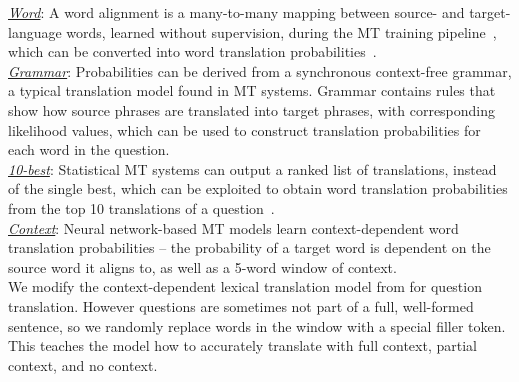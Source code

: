 \documentclass{sig-alternate-05-2015}
\begin{document}
\noindent \underline{\emph{Word}}: A word alignment is a many-to-many mapping between source- and target-language words,
learned without supervision, during the MT training pipeline~\cite{Och:2003a}, which 
can be converted into word translation probabilities~\cite{Darwish:2003aa}.\\
\underline{\emph{Grammar}}: Probabilities can be derived from a synchronous context-free grammar, a typical
translation model found in MT systems. Grammar contains rules that show how source phrases
are translated into target phrases, with corresponding likelihood values, which can be used to construct translation 
probabilities for each word in the question.\\
\underline{\emph{10-best}}: Statistical MT systems can output a ranked list of translations, instead of the single best, which 
can be exploited to obtain word translation probabilities from the top 10 translations of a question~\cite{Ture:2014aa}.\\
\underline{\emph{Context}}: Neural network-based MT models learn context-dependent word translation probabilities -- 
the probability of a target word is dependent on the source word it aligns to, as well as a 5-word window of context.\\
We modify the context-dependent lexical translation model from \cite{Devlin:2014} for question translation.  
However questions are sometimes not part of a full, well-formed sentence, so we randomly replace 
words in the window with a special filler token. This teaches the model how to accurately translate with full context, partial 
context, and no context.\\
\end{document}
